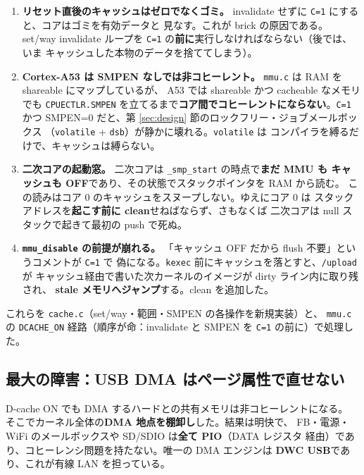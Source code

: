 \begin{enumerate}[leftmargin=1.6em]
  \item \textbf{リセット直後のキャッシュはゼロでなくゴミ。}
        invalidate せずに \texttt{C=1} にすると、コアはゴミを有効データと
        見なす。これが brick の原因である。set/way invalidate ループを
        \texttt{C=1} の\textbf{前に}実行しなければならない（後では、いま
        キャッシュした本物のデータを捨ててしまう）。

  \item \textbf{Cortex-A53 は SMPEN なしでは非コヒーレント。}
        \texttt{mmu.c} は RAM を shareable にマップしているが、
        A53 では shareable かつ cacheable なメモリでも \texttt{CPUECTLR.SMPEN}
        を立てるまで\textbf{コア間でコヒーレントにならない}。\texttt{C=1} かつ
        SMPEN=0 だと、第 \ref{sec:design} 節のロックフリー・ジョブメールボックス
        （\texttt{volatile} + \texttt{dsb}）が静かに壊れる。\texttt{volatile} は
        コンパイラを縛るだけで、キャッシュは縛らない。

  \item \textbf{二次コアの起動窓。}
        二次コアは \texttt{\_smp\_start} の時点で\textbf{まだ MMU も
        キャッシュも OFF}であり、その状態でスタックポインタを RAM から読む。
        この読みはコア 0 のキャッシュをスヌープしない。ゆえにコア 0 は
        スタックアドレスを\textbf{起こす前に clean}せねばならず、さもなくば
        二次コアは null スタックで起きて最初の push で死ぬ。

  \item \textbf{\texttt{mmu\_disable} の前提が崩れる。}
        「キャッシュ OFF だから flush 不要」というコメントが \texttt{C=1} で
        偽になる。\texttt{kexec} 前にキャッシュを落とすと、\texttt{/upload} が
        キャッシュ経由で書いた次カーネルのイメージが dirty ライン内に取り残され、
        \textbf{stale メモリへジャンプ}する。clean を追加した。
\end{enumerate}

\noindent
これらを \texttt{cache.c}（set/way・範囲・SMPEN の各操作を新規実装）と、
\texttt{mmu.c} の \texttt{DCACHE\_ON} 経路（順序が命：invalidate と SMPEN を
\texttt{C=1} の前に）で処理した。

\subsection{最大の障害：USB DMA はページ属性で直せない}
\label{sec:dcache-usb}

D-cache ON でも DMA するハードとの共有メモリは非コヒーレントになる。
そこでカーネル全体の\textbf{DMA 地点を棚卸し}した。結果は明快で、
FB・電源・WiFi のメールボックスや SD/SDIO は\textbf{全て PIO}（DATA レジスタ
経由）であり、コヒーレンシ問題を持たない。唯一の DMA エンジンは
\textbf{DWC USB}であり、これが有線 LAN を担っている。

